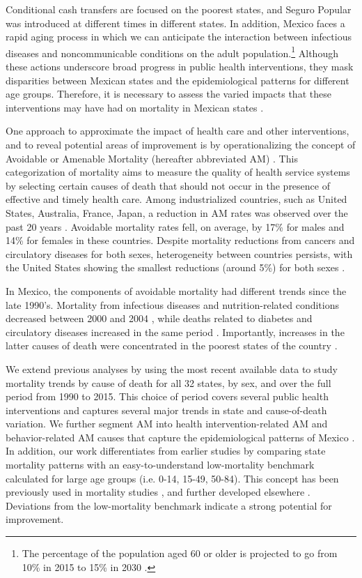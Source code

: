 \documentclass{bmcart}
\begin{document}
Conditional cash transfers are focused on the poorest states, and Seguro Popular was introduced at different times in different states. In addition, Mexico faces a rapid aging process in which we can anticipate the interaction between infectious diseases and noncommunicable conditions \cite{Bygbjerg1499} on the adult population.\footnote{The percentage of the population aged 60 or older is projected to go from 10\% in 2015 to 15\% in 2030 \cite{CONAPO}.} Although these actions underscore broad progress in public health interventions, they mask disparities between Mexican states and the epidemiological patterns for different age groups. Therefore, it is necessary to assess the varied impacts that these interventions may have had on mortality in Mexican states \cite{urquieta2015evolution}. 

 
 One approach to approximate the impact of health care and other interventions, and to reveal potential areas of improvement is by operationalizing the
 concept of Avoidable or Amenable Mortality (hereafter abbreviated AM)
 \cite{nolte&mckee2004, nolte&mckee2008,elo2014}. This categorization of mortality aims to measure the quality of health service systems by selecting certain
 causes of death that should not occur in the presence of effective and
 timely health care. Among industrialized countries, such as United States,
 Australia, France, Japan, a reduction in AM rates was
 observed over the past 20 years
 \cite{nolte&mckee2008}. Avoidable mortality rates fell, on average, by 17\%
 for males and 14\% for females in these countries. Despite mortality reductions from cancers and circulatory diseases for
 both sexes, heterogeneity between countries persists, with the United
 States showing the smallest reductions (around 5\%) for both sexes  \cite{nolte&mckee2008}. 
 
 In Mexico, the components of avoidable mortality had different trends since the
late 1990's. Mortality from infectious diseases and nutrition-related conditions decreased between 2000 and 2004 \cite{francomarina2006}, while deaths related to diabetes and circulatory diseases increased in the same period \cite{agudelo2014efecto}. Importantly, increases in the latter causes
of death were concentrated in the poorest states of the country
\cite{davila2014mortalidad}. 

We extend previous analyses by using the most recent available data to study mortality trends by cause of death for all 32 states, by sex, and over the full period from 1990 to 2015. This choice of period covers several public health interventions and captures several major trends in state and cause-of-death variation. We further segment AM into health intervention-related AM and
behavior-related AM causes that capture the epidemiological patterns of Mexico \cite{Aburto2015}. In addition, our work differentiates from earlier studies by comparing state mortality patterns with an easy-to-understand low-mortality benchmark calculated for large age groups (i.e. 0-14, 15-49, 50-84). This concept has been previously used in mortality studies \cite{whelpton1947}, and further developed elsewhere 
\cite{wunsch1975minimum,vallin2008minimum}. Deviations from the low-mortality benchmark indicate a strong potential for improvement.
\end{document}
